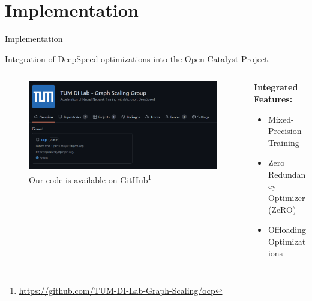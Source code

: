 \section{Implementation}

\begin{frame}{Implementation}
    \begin{center}
        \vspace{0.5cm}
        Integration of DeepSpeed optimizations into the Open Catalyst Project.
    \end{center}

    \begin{columns}
        \begin{column}{0.5\textwidth}
            \begin{center}
                \vspace{0.75cm}
                \begin{figure}[H]
                    \includegraphics[scale=0.22]{figures/ocp-branch.png}
                    \caption*{Our code is available on GitHub\footnote{\url{https://github.com/TUM-DI-Lab-Graph-Scaling/ocp}}}
                \end{figure}
            \end{center}  
        \end{column} 

        \begin{column}{0.5\textwidth}
            \textbf{Integrated Features:}

            \begin{itemize}
                \item \textcolor{green}{} Mixed-Precision Training
                \item \textcolor{green}{} Zero Redundancy Optimizer (ZeRO)
                \item \textcolor{green}{} Offloading Optimizations
            \end{itemize}
        \end{column} 
    \end{columns}
\end{frame}

